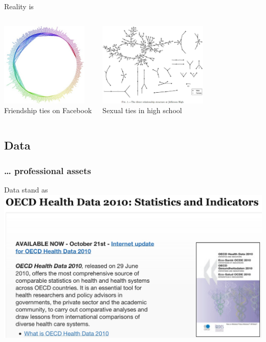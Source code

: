 \documentclass{beamer}
\begin{document}
	\begin{frame}[c]{Reality is }

		\begin{columns}[T]
			\begin{center}
				\includegraphics[height=4cm]{images/friendwheel.jpg}\\
				\vspace{0.74cm}
				Friendship ties on Facebook
			\end{center}
			\begin{center}
				\href{http://www.sociology.columbia.edu/pdf-files/bearmanarticle.pdf}{\includegraphics[height=4cm]{images/network.jpg}}\\
				\vspace{0.7cm}
				Sexual ties in high school
			\end{center}
		\end{columns}			
	\end{frame}
	
	\subsection{Data}
	
	\subsubsection{… professional assets}
	
	\begin{frame}[t]{Data stand as }
		\includegraphics[width=\textwidth]{images/oecd.jpg}
	\end{frame}
	
\end{document}
